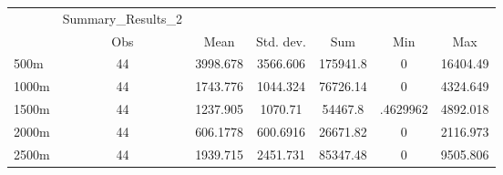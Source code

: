 \begin{tabular}{l*{6}{c}}
\hline\hline
            &Summary\_Results\_2&            &            &            &            &            \\
            &         Obs&        Mean&   Std. dev.&         Sum&         Min&         Max\\
\hline
500m        &          44&    3998.678&    3566.606&    175941.8&           0&    16404.49\\
1000m       &          44&    1743.776&    1044.324&    76726.14&           0&    4324.649\\
1500m       &          44&    1237.905&     1070.71&     54467.8&    .4629962&    4892.018\\
2000m       &          44&    606.1778&    600.6916&    26671.82&           0&    2116.973\\
2500m       &          44&    1939.715&    2451.731&    85347.48&           0&    9505.806\\
\hline\hline
\end{tabular}
